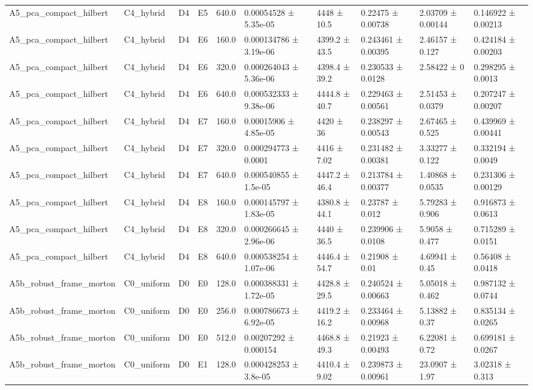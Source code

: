 \begin{table}
\begin{tabular}{llllllllll}
A5\_pca\_compact\_hilbert & C4\_hybrid & D4 & E5 & 640.0 & 0.00054528 ± 5.35e-05 & 4448 ± 10.5 & 0.22475 ± 0.00738 & 2.03709 ± 0.00144 & 0.146922 ± 0.00213 \\
A5\_pca\_compact\_hilbert & C4\_hybrid & D4 & E6 & 160.0 & 0.000134786 ± 3.19e-06 & 4399.2 ± 43.5 & 0.243461 ± 0.00395 & 2.46157 ± 0.127 & 0.424184 ± 0.00203 \\
A5\_pca\_compact\_hilbert & C4\_hybrid & D4 & E6 & 320.0 & 0.000264043 ± 5.36e-06 & 4398.4 ± 39.2 & 0.230533 ± 0.0128 & 2.58422 ± 0 & 0.298295 ± 0.0013 \\
A5\_pca\_compact\_hilbert & C4\_hybrid & D4 & E6 & 640.0 & 0.000532333 ± 9.38e-06 & 4444.8 ± 40.7 & 0.229463 ± 0.00561 & 2.51453 ± 0.0379 & 0.207247 ± 0.00207 \\
A5\_pca\_compact\_hilbert & C4\_hybrid & D4 & E7 & 160.0 & 0.00015906 ± 4.85e-05 & 4420 ± 36 & 0.238297 ± 0.00543 & 2.67465 ± 0.525 & 0.439969 ± 0.00441 \\
A5\_pca\_compact\_hilbert & C4\_hybrid & D4 & E7 & 320.0 & 0.000294773 ± 0.0001 & 4416 ± 7.02 & 0.231482 ± 0.00381 & 3.33277 ± 0.122 & 0.332194 ± 0.0049 \\
A5\_pca\_compact\_hilbert & C4\_hybrid & D4 & E7 & 640.0 & 0.000540855 ± 1.5e-05 & 4447.2 ± 46.4 & 0.213784 ± 0.00377 & 1.40868 ± 0.0535 & 0.231306 ± 0.00129 \\
A5\_pca\_compact\_hilbert & C4\_hybrid & D4 & E8 & 160.0 & 0.000145797 ± 1.83e-05 & 4380.8 ± 44.1 & 0.23787 ± 0.012 & 5.79283 ± 0.906 & 0.916873 ± 0.0613 \\
A5\_pca\_compact\_hilbert & C4\_hybrid & D4 & E8 & 320.0 & 0.000266645 ± 2.96e-06 & 4440 ± 36.5 & 0.239906 ± 0.0108 & 5.9058 ± 0.477 & 0.715289 ± 0.0151 \\
A5\_pca\_compact\_hilbert & C4\_hybrid & D4 & E8 & 640.0 & 0.000538254 ± 1.07e-06 & 4446.4 ± 54.7 & 0.21908 ± 0.01 & 4.69941 ± 0.45 & 0.56408 ± 0.0418 \\
A5b\_robust\_frame\_morton & C0\_uniform & D0 & E0 & 128.0 & 0.000388331 ± 1.72e-05 & 4428.8 ± 29.5 & 0.240524 ± 0.00663 & 5.05018 ± 0.462 & 0.987132 ± 0.0744 \\
A5b\_robust\_frame\_morton & C0\_uniform & D0 & E0 & 256.0 & 0.000786673 ± 6.92e-05 & 4419.2 ± 16.2 & 0.233464 ± 0.00968 & 5.13882 ± 0.37 & 0.835134 ± 0.0265 \\
A5b\_robust\_frame\_morton & C0\_uniform & D0 & E0 & 512.0 & 0.00207292 ± 0.000154 & 4468.8 ± 49.3 & 0.21923 ± 0.00493 & 6.22081 ± 0.72 & 0.699181 ± 0.0267 \\
A5b\_robust\_frame\_morton & C0\_uniform & D0 & E1 & 128.0 & 0.000428253 ± 3.8e-05 & 4410.4 ± 9.02 & 0.239873 ± 0.00961 & 23.0907 ± 1.97 & 3.02318 ± 0.313 \\

\end{tabular}
\end{table}

